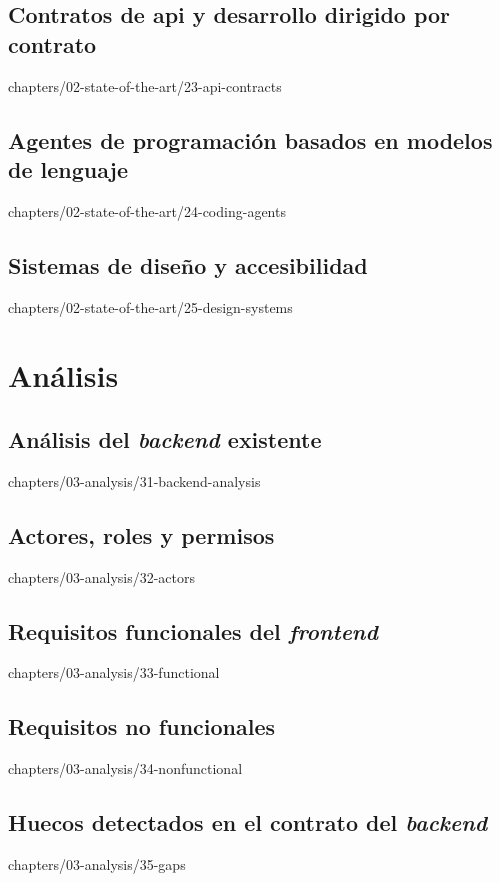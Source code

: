 \documentclass[epsbased,tfg,covers,final,printable,extendedindex,%
               firstnumbered,lof,lot,loc]{tfgtfmthesisuam}
\begin{document}
  \section[Contratos de API y desarrollo dirigido por contrato]%
          {Contratos de \acs{api} y desarrollo dirigido por
           contrato\label{SEC:SOTA-CONTRACT}}%
          {chapters/02-state-of-the-art/23-api-contracts}
  \section[Agentes de programación basados en LLM]%
          {Agentes de programación basados en modelos de
           lenguaje\label{SEC:SOTA-AGENTS}}%
          {chapters/02-state-of-the-art/24-coding-agents}
  \section{Sistemas de diseño y accesibilidad\label{SEC:SOTA-DESIGN}}%
          {chapters/02-state-of-the-art/25-design-systems}

\chapter{Análisis\label{CAP:ANALYSIS}}
  \section[Análisis del backend existente]%
          {Análisis del \textit{backend} existente\label{SEC:AN-BACKEND}}%
          {chapters/03-analysis/31-backend-analysis}
  \section{Actores, roles y permisos\label{SEC:AN-ACTORS}}%
          {chapters/03-analysis/32-actors}
  \section{Requisitos funcionales del \textit{frontend}\label{SEC:AN-RF}}%
          {chapters/03-analysis/33-functional}
  \section{Requisitos no funcionales\label{SEC:AN-RNF}}%
          {chapters/03-analysis/34-nonfunctional}
  \section[Huecos del contrato]%
          {Huecos detectados en el contrato del
           \textit{backend}\label{SEC:AN-GAPS}}%
          {chapters/03-analysis/35-gaps}
\end{document}
